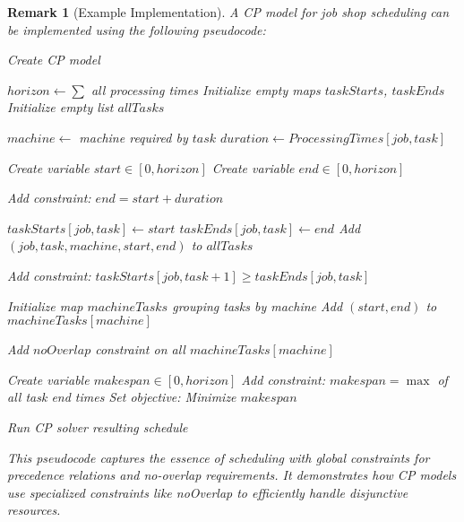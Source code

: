 \documentclass{article}
\newtheorem{remark}{Remark}
\theoremstyle{definition}
\begin{document}
\begin{remark}[Example Implementation]
A CP model for job shop scheduling can be implemented using the following pseudocode:

\begin{algorithm}
\caption{CP Implementation for Job Shop Scheduling}
\begin{algorithmic}[1]
    \State Create CP model
    
    \State $horizon \gets \sum$ all processing times
    \State Initialize empty maps $taskStarts$, $taskEnds$
    \State Initialize empty list $allTasks$
    
            \State $machine \gets$ machine required by $task$
            \State $duration \gets ProcessingTimes[job, task]$
            
            \State Create variable $start \in [0, horizon]$
            \State Create variable $end \in [0, horizon]$
            
            \State Add constraint: $end = start + duration$
            
            \State $taskStarts[job, task] \gets start$
            \State $taskEnds[job, task] \gets end$
            \State Add $(job, task, machine, start, end)$ to $allTasks$
        \EndFor
    \EndFor
    
            \State Add constraint: $taskStarts[job, task+1] \geq taskEnds[job, task]$
        \EndFor
    \EndFor
    
    \State Initialize map $machineTasks$ grouping tasks by machine
        \State Add $(start, end)$ to $machineTasks[machine]$
    \EndFor
    
        \State Add $noOverlap$ constraint on all $machineTasks[machine]$
    \EndFor
    
    \State Create variable $makespan \in [0, horizon]$
    \State Add constraint: $makespan = \max$ of all task end times
    \State Set objective: Minimize $makespan$
    
    \State Run CP solver
    \State \Return resulting schedule
\EndProcedure
\end{algorithmic}
\end{algorithm}

This pseudocode captures the essence of scheduling with global constraints for precedence relations and no-overlap requirements. It demonstrates how CP models use specialized constraints like noOverlap to efficiently handle disjunctive resources.
\end{remark}
\end{document}
